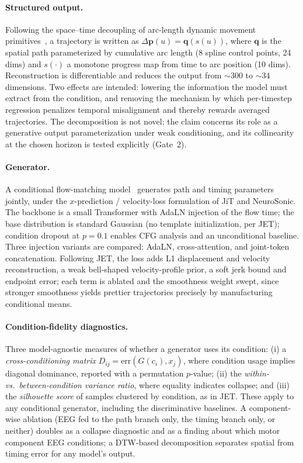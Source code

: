 \documentclass[11pt]{article}
\newcommand{\bq}{\mathbf{q}}
\newcommand{\bp}{\mathbf{p}}
\begin{document}
\paragraph{Structured output.} Following the space--time decoupling of arc-length dynamic movement primitives~\cite{dmp}, a trajectory is written as $\Delta\bp(u)=\bq(s(u))$, where $\bq$ is the spatial path parameterized by cumulative arc length (8 spline control points, 24 dims) and $s(\cdot)$ a monotone progress map from time to arc position (10 dims). Reconstruction is differentiable and reduces the output from ${\sim}300$ to ${\sim}34$ dimensions. Two effects are intended: lowering the information the model must extract from the condition, and removing the mechanism by which per-timestep regression penalizes temporal misalignment and thereby rewards averaged trajectories. The decomposition is not novel; the claim concerns its role as a generative output parameterization under weak conditioning, and its collinearity at the chosen horizon is tested explicitly (Gate~2).

\paragraph{Generator.} A conditional flow-matching model~\cite{fm} generates path and timing parameters jointly, under the $x$-prediction / velocity-loss formulation of JiT and NeuroSonic. The backbone is a small Transformer with AdaLN injection of the flow time; the base distribution is standard Gaussian (no template initialization, per JET); condition dropout at $p=0.1$ enables CFG analysis and an unconditional baseline. Three injection variants are compared: AdaLN, cross-attention, and joint-token concatenation. Following JET, the loss adds L1 displacement and velocity reconstruction, a weak bell-shaped velocity-profile prior, a soft jerk bound and endpoint error; each term is ablated and the smoothness weight swept, since stronger smoothness yields prettier trajectories precisely by manufacturing conditional means.

\paragraph{Condition-fidelity diagnostics.} Three model-agnostic measures of whether a generator uses its condition: (i) a \emph{cross-conditioning matrix} $D_{ij}=\mathrm{err}(G(c_i),x_j)$, where condition usage implies diagonal dominance, reported with a permutation $p$-value; (ii) the \emph{within- vs.\ between-condition variance ratio}, where equality indicates collapse; and (iii) the \emph{silhouette score} of samples clustered by condition, as in JET. These apply to any conditional generator, including the discriminative baselines. A component-wise ablation (EEG fed to the path branch only, the timing branch only, or neither) doubles as a collapse diagnostic and as a finding about which motor component EEG conditions; a DTW-based decomposition separates spatial from timing error for any model's output.
\end{document}
